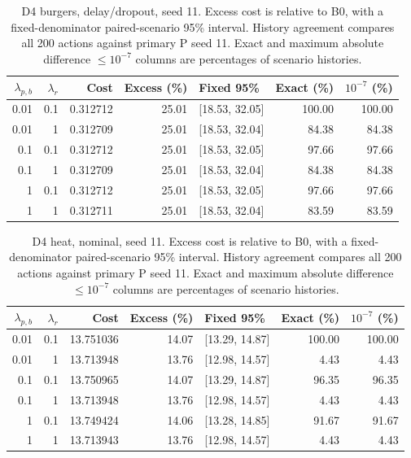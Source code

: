 \begin{table}[ht]
\centering\small
\caption{D4 burgers, delay/dropout, seed 11. Excess cost is relative to B0, with a fixed-denominator paired-scenario 95\% interval. History agreement compares all 200 actions against primary P seed 11. Exact and maximum absolute difference $\leq10^{-7}$ columns are percentages of scenario histories.}\label{tab:weights_control_burgers_locked_delay_dropout}
\begin{tabular}{@{}rrrrlrr@{}}\toprule
$\lambda_{p,b}$ & $\lambda_r$ & Cost & Excess (\%) & Fixed 95\% & Exact (\%) & $10^{-7}$ (\%)\\\midrule
0.01 & 0.1 & 0.312712 & 25.01 & [18.53, 32.05] & 100.00 & 100.00\\
0.01 & 1 & 0.312709 & 25.01 & [18.53, 32.04] & 84.38 & 84.38\\
0.1 & 0.1 & 0.312712 & 25.01 & [18.53, 32.05] & 97.66 & 97.66\\
0.1 & 1 & 0.312709 & 25.01 & [18.53, 32.04] & 84.38 & 84.38\\
1 & 0.1 & 0.312712 & 25.01 & [18.53, 32.05] & 97.66 & 97.66\\
1 & 1 & 0.312711 & 25.01 & [18.53, 32.04] & 83.59 & 83.59\\
\bottomrule\end{tabular}
\end{table}

\begin{table}[ht]
\centering\small
\caption{D4 heat, nominal, seed 11. Excess cost is relative to B0, with a fixed-denominator paired-scenario 95\% interval. History agreement compares all 200 actions against primary P seed 11. Exact and maximum absolute difference $\leq10^{-7}$ columns are percentages of scenario histories.}\label{tab:weights_control_heat_locked_nominal}
\begin{tabular}{@{}rrrrlrr@{}}\toprule
$\lambda_{p,b}$ & $\lambda_r$ & Cost & Excess (\%) & Fixed 95\% & Exact (\%) & $10^{-7}$ (\%)\\\midrule
0.01 & 0.1 & 13.751036 & 14.07 & [13.29, 14.87] & 100.00 & 100.00\\
0.01 & 1 & 13.713948 & 13.76 & [12.98, 14.57] & 4.43 & 4.43\\
0.1 & 0.1 & 13.750965 & 14.07 & [13.29, 14.87] & 96.35 & 96.35\\
0.1 & 1 & 13.713948 & 13.76 & [12.98, 14.57] & 4.43 & 4.43\\
1 & 0.1 & 13.749424 & 14.06 & [13.28, 14.85] & 91.67 & 91.67\\
1 & 1 & 13.713943 & 13.76 & [12.98, 14.57] & 4.43 & 4.43\\
\bottomrule\end{tabular}
\end{table}

